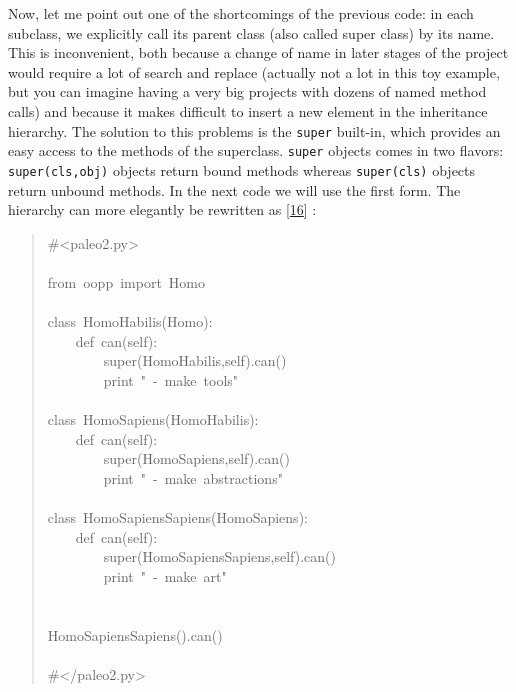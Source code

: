 \documentclass[10pt,english]{article}
\begin{document}
Now, let me point out one of the shortcomings of the previous code: in each
subclass, we explicitly call its parent class (also called super class)
by its name. This is inconvenient, both because a change of name in
later stages of the project would require a lot of search and replace
(actually not a lot in this toy example, but you can imagine having
a very big projects with dozens of named method calls) and because it makes 
difficult to insert a new element in the inheritance hierarchy. 
The solution to this problems is the
\texttt{super} built-in, which provides an easy access to the methods
of the superclass.
\texttt{super} objects comes in two flavors: \texttt{super(cls,obj)} objects return 
bound methods whereas \texttt{super(cls)} objects return unbound methods.
In the next code we will use the first form. The hierarchy can more elegantly 
be rewritten as [\hyperlink{id32}{16}] :
\begin{quote}
\begin{ttfamily}\begin{flushleft}
\mbox{{\#}<paleo2.py>}\\
\mbox{}\\
\mbox{from~oopp~import~Homo}\\
\mbox{}\\
\mbox{class~HomoHabilis(Homo):}\\
\mbox{~~~~def~can(self):}\\
\mbox{~~~~~~~~super(HomoHabilis,self).can()}\\
\mbox{~~~~~~~~print~"~-~make~tools"}\\
\mbox{}\\
\mbox{class~HomoSapiens(HomoHabilis):}\\
\mbox{~~~~def~can(self):}\\
\mbox{~~~~~~~~super(HomoSapiens,self).can()}\\
\mbox{~~~~~~~~print~"~-~make~abstractions"}\\
\mbox{~~~~~~}\\
\mbox{class~HomoSapiensSapiens(HomoSapiens):}\\
\mbox{~~~~def~can(self):}\\
\mbox{~~~~~~~~super(HomoSapiensSapiens,self).can()}\\
\mbox{~~~~~~~~print~"~-~make~art"}\\
\mbox{}\\
\mbox{}\\
\mbox{HomoSapiensSapiens().can()}\\
\mbox{}\\
\mbox{{\#}</paleo2.py>}
\end{flushleft}\end{ttfamily}
\end{quote}
\end{document}
